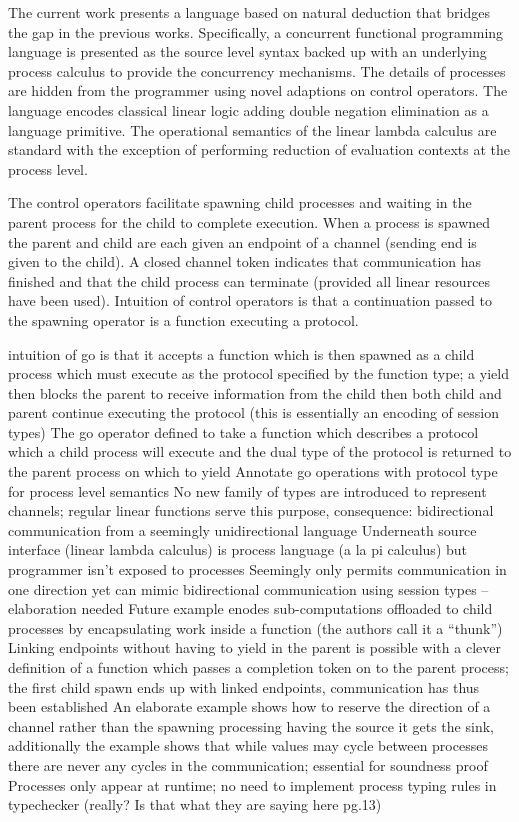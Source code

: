 \documentclass[11pt]{article}
\begin{document}
The current work presents a language based on natural deduction that bridges
the gap in the previous works. Specifically, a concurrent functional
programming language is presented as the source level syntax backed up with an
underlying process calculus to provide the concurrency mechanisms. The details
of processes are hidden from the programmer using novel adaptions on control
operators. The language encodes classical linear logic adding double negation
elimination as a language primitive. The operational semantics of the linear
lambda calculus are standard with the exception of performing reduction of
evaluation contexts at the process level.

The control operators facilitate spawning child processes and waiting in the
parent process for the child to complete execution. When a process is spawned
the parent and child are each given an endpoint of a channel (sending end is
given to the child). A closed channel token indicates that communication has
finished and that the child process can terminate (provided all linear
resources have been used). Intuition of control operators is that a
continuation passed to the spawning operator is a function executing a
protocol.

 intuition of go is that it accepts a function which is then spawned as a
child process which must execute as the protocol specified by the function
type; a yield then blocks the parent to receive information from the child
then both child and parent continue executing the protocol (this is
essentially an encoding of session types)
 The go operator defined to take a function which describes a protocol which
a child process will execute and the dual type of the protocol is returned to
the parent process on which to yield
 Annotate go operations with protocol type for process level semantics
 No new family of types are introduced to represent channels; regular linear
functions serve this purpose, consequence: bidirectional communication from
a seemingly unidirectional language
 Underneath source interface (linear lambda calculus) is process language (a
la pi calculus) but programmer isn't exposed to processes
 Seemingly only permits communication in one direction yet can mimic
bidirectional communication using session types -- elaboration needed
 Future example enodes sub-computations offloaded to child processes by
encapsulating work inside a function (the authors call it a ``thunk'')
 Linking endpoints without having to yield in the parent is possible with a
clever definition of a function which passes a completion token on to the
parent process; the first child spawn ends up with linked endpoints,
communication has thus been established
 An elaborate example shows how to reserve the direction of a channel rather
than the spawning processing having the source it gets the sink, additionally
the example shows that while values may cycle between processes there are
never any cycles in the communication; essential for soundness proof
 Processes only appear at runtime; no need to implement process typing rules
in typechecker (really? Is that what they are saying here pg.13)
\end{document}
